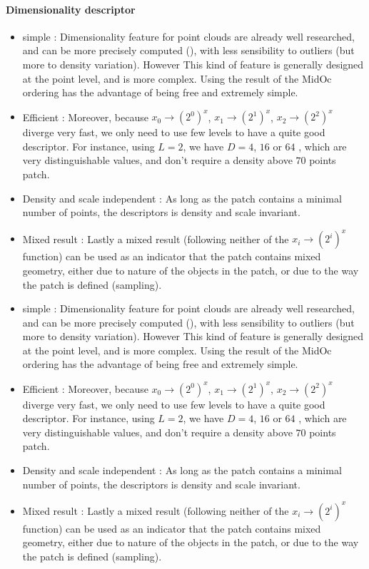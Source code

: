			\paragraph{Dimensionality descriptor}
			\begin{itemize}			
				\item simple : 
				Dimensionality feature for point clouds are already well researched, and can be more precisely computed (\cite{Demantke2014}), with less sensibility to outliers (but more to density variation). However This kind of feature is generally designed at the point level, and is more complex.
				Using the result of the MidOc ordering has the advantage of being free and extremely simple. 
				\item Efficient :
				Moreover, because $x_0 \rightarrow (2^0)^x$,
				$x_1 \rightarrow (2^1)^x$, $x_2 \rightarrow (2^2)^x$ diverge very fast, we only need to use few levels to have a quite good descriptor. For instance, using $L=2$, we have $D=4$, $16$ or $64$ , which are very distinguishable values, and don't require a density above $70$ points \per patch. 
				\item Density and scale independent :
				As long as the patch contains a minimal number of points, the descriptors is density and scale invariant.
				\item Mixed result : 
				Lastly a mixed result (following neither of the $x_i \rightarrow (2^i)^x$ function) can be used as an indicator that the patch contains mixed geometry, either due to nature of the objects in the patch, or due to the way the patch is defined (sampling).
			\end{itemize}	
 
			\begin{itemize}			
				\item simple : 
				Dimensionality feature for point clouds are already well researched, and can be more precisely computed (\cite{Demantke2014}), with less sensibility to outliers (but more to density variation). However This kind of feature is generally designed at the point level, and is more complex.
				Using the result of the MidOc ordering has the advantage of being free and extremely simple. 
				\item Efficient :
				Moreover, because $x_0 \rightarrow (2^0)^x$,
				$x_1 \rightarrow (2^1)^x$, $x_2 \rightarrow (2^2)^x$ diverge very fast, we only need to use few levels to have a quite good descriptor. For instance, using $L=2$, we have $D=4$, $16$ or $64$ , which are very distinguishable values, and don't require a density above $70$ points \per patch. 
				\item Density and scale independent :
				As long as the patch contains a minimal number of points, the descriptors is density and scale invariant.
				\item Mixed result : 
				Lastly a mixed result (following neither of the $x_i \rightarrow (2^i)^x$ function) can be used as an indicator that the patch contains mixed geometry, either due to nature of the objects in the patch, or due to the way the patch is defined (sampling).
			\end{itemize}	
			 
